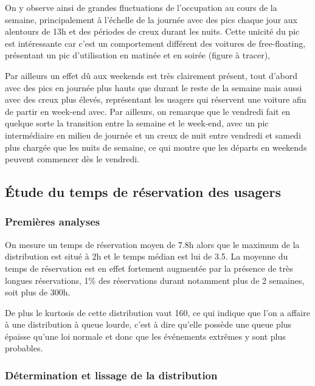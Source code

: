 \documentclass[12pt,a4paper]{article}
\newcommand{\1}[1]{\mathbbm{1}_{\{#1\}} }
\theoremstyle{definition}
\begin{document}
{On y observe ainsi de grandes fluctuations de l'occupation au cours de la semaine, principalement à l'échelle de la journée avec des pics chaque jour aux alentours de 13h et des périodes de creux durant les nuits.
Cette unicité du pic est intéressante car c'est un comportement différent des voitures de free-floating, présentant un pic d'utilisation en matinée et en soirée (figure à tracer), 

Par ailleurs un effet dû aux weekends est très clairement présent, tout d'abord avec des pics en journée plus hauts que durant le reste de la semaine mais aussi avec des creux plus élevés, représentant les usagers qui réservent une voiture afin de partir en week-end avec. Par ailleurs, on remarque que le vendredi fait en quelque sorte la transition entre la semaine et le week-end, avec un pic intermédiaire en milieu de journée et un creux de nuit entre vendredi et samedi plus chargée que les nuits de semaine, ce qui montre que les départs en weekends peuvent commencer dès le vendredi.






\subsection{Étude du temps de réservation des usagers}


\subsubsection{Premières analyses}

On mesure un temps de réservation moyen de 7.8h alors que le maximum de la distribution est situé à 2h et le temps médian est lui de 3.5. La moyenne du temps de réservation est en effet fortement augmentée par la présence de très longues réservations, 1\% des réservations durant notamment plus de 2 semaines, soit plus de 300h.

De plus le kurtosis de cette distribution vaut 160, ce qui indique que l'on a affaire à une distribution à queue lourde, c'est à dire qu'elle possède une queue plus épaisse qu'une loi normale et donc que les événements extrêmes y sont plus probables.



\subsubsection{Détermination et lissage de la distribution}

}
\end{document}
